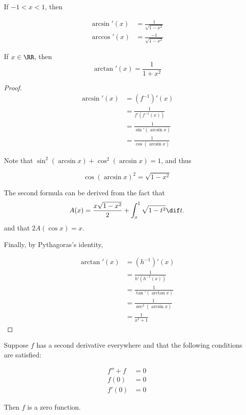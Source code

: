 \documentclass[11pt]{scrartcl}
\begin{document}
\begin{theorem}

  If $-1<x<1$, then

  \begin{align}
    \arcsin'(x) &= \frac{1}{\sqrt{1-x^2}}\\
    \arccos'(x) &= \frac{-1}{\sqrt{1-x^2}}
  \end{align}

  If $x \in \RR$, then
  \begin{equation*}
    \arctan'(x) = \frac{1}{1+x^2}
  \end{equation*}
\end{theorem}
\begin{proof}
  \begin{align}
    \arcsin'(x) & = (f^{-1})'(x)               \\
                & = \frac{1}{f'(f^{-1}(x))}    \\
                & = \frac{1}{\sin'(\arcsin x)} \\
                & = \frac{1}{\cos(\arcsin x)}
  \end{align}

  Note that $\sin^2(\arcsin x) + \cos^2(\arcsin x) = 1$, and thus

  \begin{equation*}
    \cos(\arcsin x)^2 = \sqrt{1-x^{2}}
  \end{equation*}

  The second formula can be derived from the fact that
  \begin{equation*}
    A(x) = \frac{x\sqrt{1-x^2}}{2} + \int_x^1\sqrt{1-t^2} \dif t.
  \end{equation*}
  and that $2A(\cos x) = x$.

  Finally, by Pythagoras's identity,

  \begin{align}
    \arctan'(x) & = (h^{-1})'(x)               \\
                & = \frac{1}{h'(h^{-1}(x))}    \\
                & = \frac{1}{\tan'(\arctan x)} \\
                & = \frac{1}{\sec^{2}(\arcsin x)}\\
                & = \frac{1}{x^1+1}
  \end{align}
\end{proof}

\begin{lemma}
  Suppose $f$ has a second derivative everywhere and that the following conditions are satisfied:

  \begin{align}
    \label{eq:1}
    f''   + f & = 0 \\
    f(0)      & = 0 \\
    f'(0)     & = 0
  \end{align}

  Then $f$ is a zero function.
\end{lemma}
\end{document}
